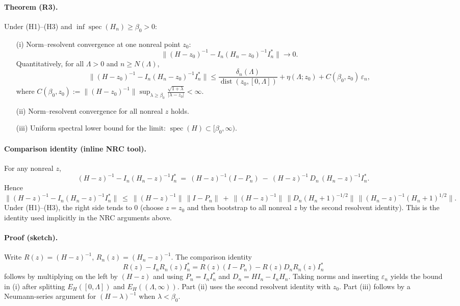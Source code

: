 \documentclass[11pt]{amsart}
\begin{document}
\paragraph{Theorem (R3).}
Under (H1)–(H3) and $\inf\operatorname{spec}(H_n)\ge \beta_0>0$:
\begin{itemize}
  \item[(i)] Norm–resolvent convergence at one nonreal point $z_0$:
  \[
    \bigl\|(H-z_0)^{-1} - I_n(H_n-z_0)^{-1} I_n^*\bigr\|\to 0.
  \]
  Quantitatively, for all $\Lambda>0$ and $n\ge N(\Lambda)$,
  \[
    \bigl\|(H-z_0)^{-1} - I_n(H_n-z_0)^{-1} I_n^*\bigr\|\le \frac{\delta_n(\Lambda)}{\operatorname{dist}(z_0,[0,\Lambda])}+\eta(\Lambda;z_0)+C(\beta_0,z_0)\,\varepsilon_n,
  \]
  where $C(\beta_0,z_0):=\bigl\|(H-z_0)^{-1}\bigr\|\sup_{\lambda\ge\beta_0} \frac{\sqrt{1+\lambda}}{|\lambda-z_0|}<\infty$.
  \item[(ii)] Norm–resolvent convergence for all nonreal $z$ holds.
  \item[(iii)] Uniform spectral lower bound for the limit: $\operatorname{spec}(H)\subset[\beta_0,\infty)$.
\end{itemize}

\paragraph{Comparison identity (inline NRC tool).}
For any nonreal $z$,
\[
  (H-z)^{-1} - I_n(H_n-z)^{-1} I_n^*\ =\ (H-z)^{-1}(I-P_n)\ -\ (H-z)^{-1}\, D_n\,(H_n-z)^{-1} I_n^*.
\]
Hence
\[
  \big\|(H-z)^{-1} - I_n(H_n-z)^{-1} I_n^*\big\|\ \le\ \|(H-z)^{-1}\|\,\|I-P_n\|\ +\ \|(H-z)^{-1}\|\,\|D_n(H_n+1)^{-1/2}\|\,\|(H_n-z)^{-1}(H_n+1)^{1/2}\|.
\]
Under (H1)–(H3), the right side tends to $0$ (choose $z=z_0$ and then bootstrap to all nonreal $z$ by the second resolvent identity). This is the identity used implicitly in the NRC arguments above.

\paragraph{Proof (sketch).}
Write $R(z)=(H-z)^{-1}$, $R_n(z)=(H_n-z)^{-1}$. The comparison identity
\[
  R(z)-I_n R_n(z) I_n^*= R(z)(I-P_n) - R(z) D_n R_n(z) I_n^*
\]
follows by multiplying on the left by $(H-z)$ and using $P_n=I_n I_n^*$ and $D_n=H I_n-I_n H_n$. Taking norms and inserting $\varepsilon_n$ yields the bound in (i) after splitting $E_H([0,\Lambda])$ and $E_H((\Lambda,\infty))$. Part (ii) uses the second resolvent identity with $z_0$. Part (iii) follows by a Neumann-series argument for $(H-\lambda)^{-1}$ when $\lambda<\beta_0$.
\end{document}
